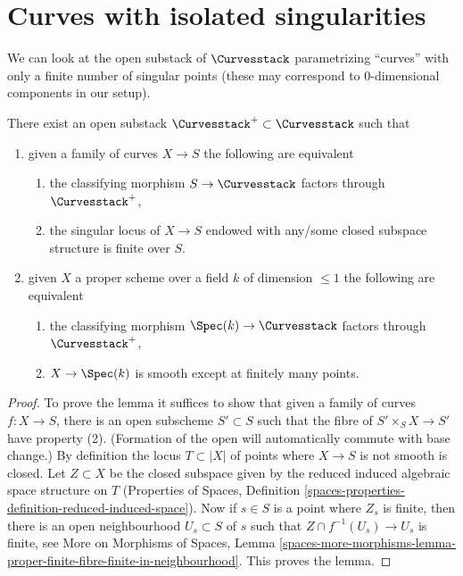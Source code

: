 \section{Curves with isolated singularities}
\label{section-curves-isolated}

\noindent
We can look at the open substack of $\Curvesstack$
parametrizing ``curves'' with only a finite number of singular
points (these may correspond to $0$-dimensional components
in our setup).

\begin{lemma}
\label{lemma-isolated-sings-curves}
There exist an open substack
$\Curvesstack^{+} \subset \Curvesstack$
such that
\begin{enumerate}
\item given a family of curves $X \to S$ the following are equivalent
\begin{enumerate}
\item the classifying morphism $S \to \Curvesstack$ factors through
$\Curvesstack^{+}$,
\item the singular locus of $X \to S$ endowed
with any/some closed subspace structure is finite over $S$.
\end{enumerate}
\item given $X$ a proper scheme over a field $k$ of dimension $\leq 1$
the following are equivalent
\begin{enumerate}
\item the classifying morphism $\Spec(k) \to \Curvesstack$ factors
through $\Curvesstack^{+}$,
\item $X \to \Spec(k)$ is smooth except at finitely many points.
\end{enumerate}
\end{enumerate}
\end{lemma}

\begin{proof}
To prove the lemma it suffices to show that given a family of curves
$f : X \to S$, there is an open subscheme $S' \subset S$
such that the fibre of $S' \times_S X \to S'$ have property (2).
(Formation of the open will automatically commute with base change.)
By definition the locus $T \subset |X|$ of points where $X \to S$
is not smooth is closed. Let $Z \subset X$ be the closed subspace
given by the reduced induced algebraic space structure on $T$
(Properties of Spaces, Definition
\ref{spaces-properties-definition-reduced-induced-space}).
Now if $s \in S$ is a point where $Z_s$ is finite, then there
is an open neighbourhood $U_s \subset S$ of $s$ such that
$Z \cap f^{-1}(U_s) \to U_s$ is finite, see
More on Morphisms of Spaces, Lemma
\ref{spaces-more-morphisms-lemma-proper-finite-fibre-finite-in-neighbourhood}.
This proves the lemma.
\end{proof}




